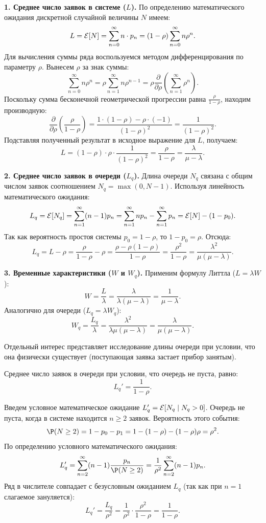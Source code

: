 \begin{sproof}
\textbf{1. Среднее число заявок в системе ($L$).} По определению математического ожидания дискретной случайной величины $N$ имеем:
$$
L = \mathcal{E}[N] = \sum_{n=0}^{\infty} n \cdot p_n = (1 - \rho) \sum_{n=0}^{\infty} n \rho^n.
$$
Для вычисления суммы ряда воспользуемся методом дифференцирования по параметру $\rho$. Вынесем $\rho$ за знак суммы:
$$
\sum_{n=0}^{\infty} n \rho^n = \rho \sum_{n=1}^{\infty} n \rho^{n-1} = \rho \frac{\partial}{\partial \rho} \left( \sum_{n=1}^{\infty} \rho^n \right).
$$
Поскольку сумма бесконечной геометрической прогрессии равна $\frac{\rho}{1-\rho}$, находим производную:
$$
\frac{\partial}{\partial \rho} \left( \frac{\rho}{1-\rho} \right) = \frac{1 \cdot (1-\rho) - \rho \cdot (-1)}{(1-\rho)^2} = \frac{1}{(1-\rho)^2}.
$$
Подставляя полученный результат в исходное выражение для $L$, получаем:
$$
L = (1 - \rho) \cdot \rho \cdot \frac{1}{(1-\rho)^2} = \frac{\rho}{1-\rho} = \frac{\lambda}{\mu - \lambda}.
$$

\textbf{2. Среднее число заявок в очереди ($L_q$).} Длина очереди $N_q$ связана с общим числом заявок соотношением $N_q = \max(0, N - 1)$. Используя линейность математического ожидания:
$$
L_q = \mathcal{E}[N_q] = \sum_{n=1}^{\infty} (n - 1) p_n = \sum_{n=1}^{\infty} n p_n - \sum_{n=1}^{\infty} p_n = \mathcal{E}[N] - (1 - p_0).
$$
Так как вероятность простоя системы $p_0 = 1 - \rho$, то $1 - p_0 = \rho$. Отсюда:
$$
L_q = L - \rho = \frac{\rho}{1-\rho} - \rho = \frac{\rho - \rho(1-\rho)}{1-\rho} = \frac{\rho^2}{1-\rho} = \frac{\lambda^2}{\mu(\mu - \lambda)}.
$$

\textbf{3. Временные характеристики ($W$ и $W_q$).} Применим формулу Литтла ($L = \lambda W$):
$$
W = \frac{L}{\lambda} = \frac{\lambda}{\lambda(\mu - \lambda)} = \frac{1}{\mu - \lambda}.
$$
Аналогично для очереди ($L_q = \lambda W_q$):
$$
W_q = \frac{L_q}{\lambda} = \frac{\lambda^2}{\lambda \mu (\mu - \lambda)} = \frac{\lambda}{\mu(\mu - \lambda)}.
$$
\end{sproof}

Отдельный интерес представляет исследование длины очереди при условии, что она физически существует (поступающая заявка застает прибор занятым).

\begin{conseq}
Среднее число заявок в очереди при условии, что очередь не пуста, равно:
$$
L_q' = \frac{1}{1-\rho}.
$$
\end{conseq}

\begin{sproof}
Введем условное математическое ожидание $L_q' = \mathcal{E}[N_q \mid N_q > 0]$. Очередь не пуста, когда в системе находится $n \ge 2$ заявок. Вероятность этого события:
$$
\P(N \ge 2) = 1 - p_0 - p_1 = 1 - (1-\rho) - (1-\rho)\rho = \rho^2.
$$
По определению условного математического ожидания:
$$
L_q' = \sum_{n=2}^{\infty} (n-1) \frac{p_n}{\P(N \ge 2)} = \frac{1}{\rho^2} \sum_{n=2}^{\infty} (n-1)p_n.
$$
Ряд в числителе совпадает с безусловным ожиданием $L_q$ (так как при $n=1$ слагаемое зануляется):
$$
L_q' = \frac{L_q}{\rho^2} = \frac{1}{\rho^2} \cdot \frac{\rho^2}{1-\rho} = \frac{1}{1-\rho}.
$$
\end{sproof}

